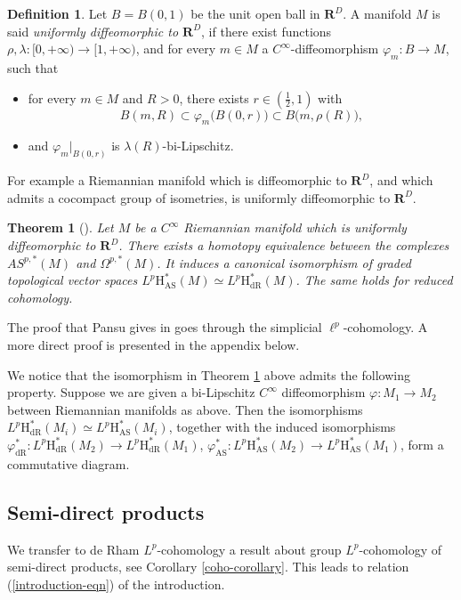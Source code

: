 \documentclass[JEP,XML,SOM,Unicode,published]{cedram}
\newcommand{\AS}{\mathrm{AS}}
\newcommand{\dR}{\mathrm{dR}}
\newcommand{\rH}{\mathrm{H}}
\newcommand{\RR}{\mathbf{R}}
\theoremstyle{plain}
\newtheorem{theorem}[equation]{Theorem}
\theoremstyle{remark}
\theoremstyle{definition}
\newtheorem{definition}[equation]{Definition}
\newcommand{\restr}{\big|}
\begin{document}
\begin{definition}
\label{semi-direct-definition}
Let $B = B(0,1)$ be the unit open ball in $\RR^D$.
A manifold $M$ is said \emph{uniformly diffeomorphic to $\RR^D$},
if there exist functions $\rho, \lambda: [0, +\infty) \to [1, +\infty)$, and for every $m \in M$ a $C^\infty$-diffeomorphism
$\varphi_m: B \to M$, such that
\begin{itemize}
\item for every $m \in M$ and $R >0$, there exists $r \in (\frac{1}{2}, 1)$ with
\[B(m,R) \subset \varphi_m \bigl(B(0,r)\bigr) \subset B\bigl(m, \rho(R)\bigr),\]
\item and $\varphi_m \restr_{B(0,r)}$ is $\lambda(R)$-bi-Lipschitz.
\end{itemize}
\end{definition}

For example a Riemannian manifold which is diffeomorphic to $\RR^D$, and which admits a cocompact group of isometries, is uniformly diffeomorphic to $\RR^D$.

\begin{theorem}[\cite{Pa95}]
\label{coho-theorem3}
Let $M$ be a $C^\infty$ Riemannian manifold which is uniformly diffeomorphic to $\RR^D$.
There exists a homotopy equivalence between the
complexes $AS^{p, *}(M)$ and $\Omega^{p,*}(M)$. It induces a canonical isomorphism of graded topological vector spaces $L^p \rH_\AS^*(M)
\simeq L^p \rH_\dR^*(M)$. The same holds for reduced cohomology.
\end{theorem}

The proof that Pansu gives in \cite{Pa95} goes through the simplicial $\ell^p$-cohomology.
A more direct proof is presented in the appendix below.

We notice that the isomorphism in Theorem \ref{coho-theorem3} above admits the following property.
Suppose we are given a bi-Lipschitz $C^\infty$ diffeomorphism $\varphi: M_1 \to M_2$ between Riemannian manifolds as above.
Then the isomorphisms
$L^p \rH_\dR^*(M_i) \simeq L^p \rH_\AS^*(M_i)$, together with the induced isomorphisms
$\varphi^*_\dR: L^p \rH_\dR^*(M_2) \to L^p \rH_\dR^*(M_1)$,
$\varphi_\AS^*: L^p \rH_\AS^*(M_2) \to L^p \rH_\AS^*(M_1)$,
form a commutative diagram.

\subsection{Semi-direct products}
We transfer to de Rham $L^p$\nobreakdash-cohomology a result about group $L^p$\nobreakdash-cohomology of semi-direct products,
see Corollary \ref{coho-corollary}.
This leads to relation (\ref{introduction-eqn}) of the introduction.
\end{document}

